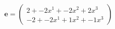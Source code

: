 \documentclass[preview]{standalone}
\begin{document}
\begin{align*}
\mathbf{e} = \begin{pmatrix}2 + -2x^{1} + -2x^{2} + 2x^{3} \\ -2 + -2x^{1} + 1x^{2} + -1x^{3}\end{pmatrix}
\end{align*}
\end{document}
